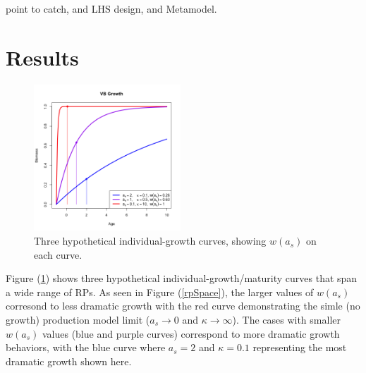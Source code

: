 %
{\color{red}
point to catch, and LHS design, and Metamodel.
}

%
%

%
%

%
\section{Results}

\begin{figure}
\vspace{-1.5cm}
\includegraphics[width=0.49\textwidth]{../ddBias/vbCurves.png}
\vspace{-1cm}
\caption{Three hypothetical individual-growth curves, showing $w(a_s)$ on each curve.}\label{vbCurves}
\end{figure}
%
Figure (\ref{vbCurves}) shows three hypothetical individual-growth/maturity curves 
that span a wide range of RPs. As seen in Figure (\ref{rpSpace}), the larger values of 
$w(a_s)$ corresond to less dramatic growth with the red curve demonstrating the 
simle (no growth) production model limit ($a_s\rightarrow0$ and $\kappa\rightarrow\infty$). 
The cases with smaller $w(a_s)$ values (blue and purple curves) correspond to more dramatic 
growth behaviors, with the blue curve where $a_s=2$ and $\kappa=0.1$ representing the most 
dramatic growth shown here.

